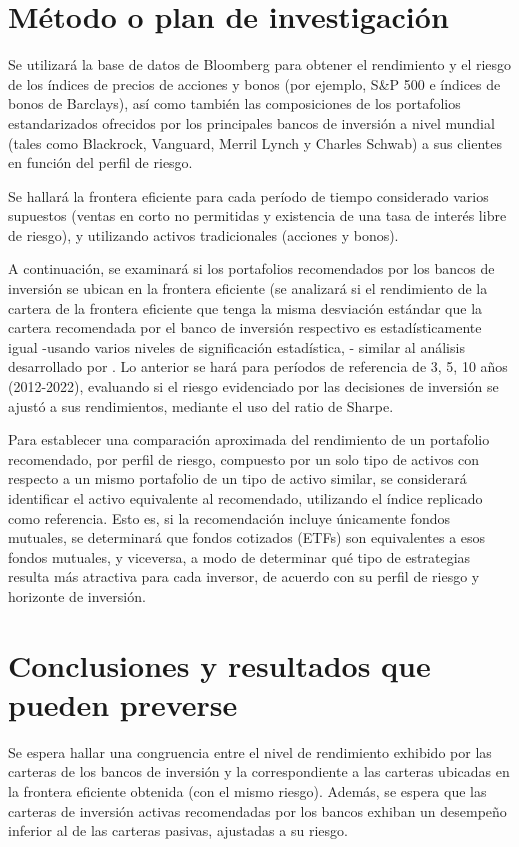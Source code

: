\section{Método o plan de investigación} 
Se utilizará la base de datos de Bloomberg para obtener el
rendimiento y el riesgo de los índices de precios de acciones y bonos (por ejemplo, S\&P 500 e índices
de bonos de Barclays), así como también las composiciones de los portafolios estandarizados ofrecidos
por los principales bancos de inversión a nivel mundial (tales como Blackrock, Vanguard, Merril Lynch
y Charles Schwab) a sus clientes en función del perfil de riesgo.

Se hallará la frontera eficiente para cada período de tiempo considerado varios supuestos (ventas en
corto no permitidas y existencia de una tasa de interés libre de riesgo), y utilizando activos
tradicionales (acciones y bonos).

A continuación, se examinará si los portafolios recomendados por los bancos de inversión se ubican
en la frontera eficiente (se analizará si el rendimiento de la cartera de la frontera eficiente que tenga
la misma desviación estándar que la cartera recomendada por el banco de inversión respectivo es 
estadísticamente igual -usando varios niveles de significación estadística, - similar al análisis
desarrollado por \cite{Garay2005}. Lo anterior se hará para períodos de referencia de 3,
5, 10 años (2012-2022), evaluando si el riesgo evidenciado por las decisiones de inversión se ajustó a
sus rendimientos, mediante el uso del ratio de Sharpe.

Para establecer una comparación aproximada del rendimiento de un portafolio recomendado, por
perfil de riesgo, compuesto por un solo tipo de activos con respecto a un mismo portafolio de un tipo
de activo similar, se considerará identificar el activo equivalente al recomendado, utilizando el índice
replicado como referencia. Esto es, si la recomendación incluye únicamente fondos mutuales, se
determinará que fondos cotizados (ETFs) son equivalentes a esos fondos mutuales, y viceversa, a
modo de determinar qué tipo de estrategias resulta más atractiva para cada inversor, de acuerdo con
su perfil de riesgo y horizonte de inversión.

\section{Conclusiones y resultados que pueden preverse} 
Se espera hallar una congruencia entre el nivel de
rendimiento exhibido por las carteras de los bancos de inversión y la correspondiente a las carteras
ubicadas en la frontera eficiente obtenida (con el mismo riesgo). Además, se espera que las carteras
de inversión activas recomendadas por los bancos exhiban un desempeño inferior al de las carteras
pasivas, ajustadas a su riesgo.






